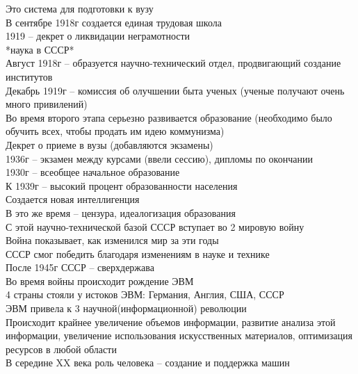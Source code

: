 \documentclass[12pt]{article}
\begin{document}
Это система для подготовки к вузу\\
В сентябре 1918г создается единая трудовая школа\\
1919 -- декрет о ликвидации неграмотности\\
*наука в СССР*\\
Август 1918г -- образуется научно-технический отдел, продвигающий создание институтов\\
Декабрь 1919г -- комиссия об олучшении быта ученых (ученые получают очень много привилений)\\
Во время второго этапа серьезно развивается образование (необходимо было обучить всех, чтобы продать им идею коммунизма)\\
Декрет о приеме в вузы (добавляются экзамены)\\
1936г -- экзамен между курсами (ввели сессию), дипломы по окончании\\
1930г -- всеобщее начальное образование\\
К 1939г -- высокий процент образованности населения\\
Создается новая интеллигенция\\
В это же время -- цензура, идеалогизация образования\\
С этой научно-технической базой СССР вступает во 2 мировую войну\\
Война показывает, как изменился мир за эти годы\\
СССР смог победить благодаря изменениям в науке и технике\\
После 1945г СССР -- сверхдержава\\
Во время войны происходит рождение ЭВМ\\
4 страны стояли у истоков ЭВМ: Германия, Англия, США, СССР\\
ЭВМ привела к 3 научной(информационной) революции\\
Происходит крайнее увеличение объемов информации, развитие анализа этой информации, увеличение использования искусственных материалов, оптимизация ресурсов в любой области\\
В середине XX века роль человека -- создание и поддержка машин\\
\end{document}
